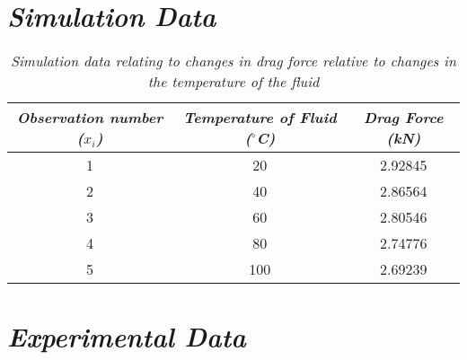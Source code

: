 

\section{\textit{Simulation Data}}

	\begin{table}[H]
		\centering
		\begin{tabular}{|c|c|c|}
			\hline
			\hline
			\textit{Observation number ($x_i$)} & \textit{Temperature of Fluid ($^\circ$C)} & \textit{Drag Force (kN)} \\
			\hline
			\hline
			1 & 20 & 2.92845 \\
			\hline
			2 & 40 & 2.86564 \\
			\hline
			3 & 60 & 2.80546 \\
			\hline
			4 & 80 & 2.74776 \\
			\hline
			5 & 100 & 2.69239 \\
			\hline
			\hline
		\end{tabular}
		\caption{\textit{Simulation data relating to changes in drag force relative to changes in the temperature of the fluid}}
		\label{simdat}
	\end{table}

\section{\textit{Experimental Data}}

